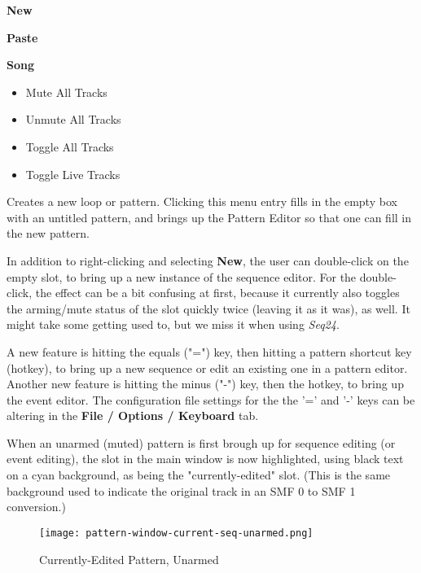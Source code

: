    \begin{enumber}
      \item \textbf{New}
      \item \textbf{Paste}
      \item \textbf{Song}
      \begin{itemize}
         \item {Mute All Tracks}
         \item {Unmute All Tracks}
         \item {Toggle All Tracks}
         \item {Toggle Live Tracks}
      \end{itemize}
   \end{enumber}

   \setcounter{ItemCounter}{0}      %

   Creates a new loop or pattern.
   Clicking this menu entry fills in the empty box with an untitled
   pattern, and brings up the Pattern Editor
   so that one can fill in the new pattern.

   In addition to right-clicking and selecting \textbf{New}, the user can
   double-click on the empty slot, to bring up a new instance of the sequence
   editor.  For the double-click, the effect can be a bit confusing at first,
   because it currently also toggles the arming/mute status of the slot
   quickly twice (leaving it as it was), as well.  It might take some getting
   used to, but we miss it when using \textsl{Seq24}.

   A new feature is hitting the equals ("=") key, then hitting
   a pattern shortcut key (hotkey), to bring up a new sequence or edit an
   existing one in a pattern editor.  Another new feature is hitting the minus
   ("-") key, then the hotkey, to bring up the event editor.  The
   configuration file settings for the the '=' and
   '-' keys can be altering in the \textbf{File / Options / Keyboard} tab.

   When an unarmed (muted) pattern is first brough up for sequence editing (or
   event editing), the slot in the main window is now highlighted, using black
   text on a cyan background, as being the "currently-edited" slot.
   (This is the same background used to indicate the original track in an
   SMF 0 to SMF 1 conversion.)

\begin{figure}[H]
   \centering 
   \texttt{[image: pattern-window-current-seq-unarmed.png]}
   \caption{Currently-Edited Pattern, Unarmed}
   \label{fig:pattern_window_current_seq_unarmed}
\end{figure}

